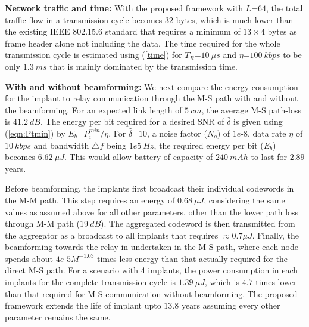 \noindent \textbf{Network traffic and time:} With the proposed framework with  $L$=$64$, the total traffic flow in a transmission cycle becomes $32$ bytes, which is much lower than the existing IEEE 802.15.6 standard that requires a minimum of $13\times 4$ bytes as frame header alone not including the data. The time required for the whole transmission cycle
is estimated using (\ref{time}) for $T_R$=$10\ \mu s$ and $\eta$=$100\ kbps$ to be only $1.3\ ms$ that is mainly dominated by the transmission time.



\noindent \textbf{With and without beamforming:} We next compare the energy consumption for the implant to relay communication through the M-S path with and without the beamforming. For an expected link length of $5\  cm$, the average M-S path-loss is $41.2\ dB$. The energy per bit required for a desired SNR of $\hat{\delta}$ is given using (\ref{eqn:Ptmin}) by $E_b$=$P_i^{min}/\eta$.   
For $\hat{\delta}$=$10$, a noise factor ($N_o$) of $1e$-$8$, data rate $\eta$ of $10 \ kbps$ and bandwidth $\triangle f$ being $1e5\  Hz$,  the required energy per bit ($E_b$) becomes $6.62\ \mu J$. This would allow battery of capacity of $240\ mAh$ to last for $2.89$ years. 
  
Before beamforming, the implants first broadcast their individual codewords in the M-M path. This step requires an energy of $0.68\ \mu J$, considering the same values as assumed above for all other parameters, other than the lower path loss through M-M path ($19\  dB$). The aggregated codeword is then transmitted from the aggregator as a broadcast to all implants that requires $\approx 0.7\mu J$. Finally, the beamforming towards the relay in undertaken in the M-S path, where each node spends about $4e$-$5M^{-1.03}$ times less energy than that actually required for the direct M-S path. For a scenario with 4 implants, the power consumption in each implants for the complete transmission cycle is $1.39\  \mu J$, which is $4.7$ times lower than that required for M-S communication without beamforming. The proposed framework extends the life of implant upto $13.8$ years assuming every other parameter remains the same.



